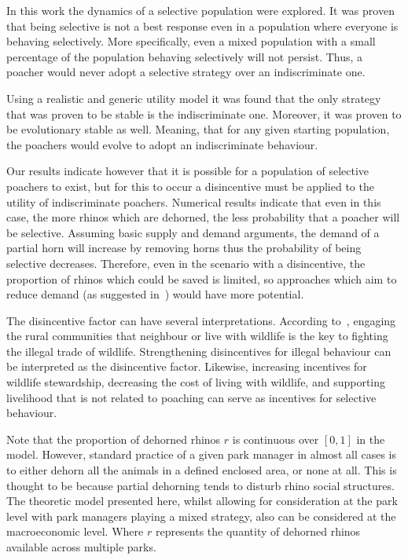\documentclass[10pt]{article}
\begin{document}
In this work the dynamics of a selective population were explored. It was proven 
that being selective is not a best response even in a population where
everyone is behaving selectively. More specifically, even a mixed population with
a small percentage of the population behaving selectively will not persist. Thus,
a poacher would never adopt a selective strategy over an indiscriminate one.

Using a realistic and generic utility model it was found that
the only strategy that was proven to be stable is the indiscriminate one.
Moreover, it was proven to be evolutionary stable as well. Meaning,
that for any given starting population, the poachers would evolve to adopt an
indiscriminate behaviour.

Our results indicate however that it is possible for a population of selective
poachers to exist, but for this to occur a disincentive must be applied to the
utility of indiscriminate poachers. Numerical results indicate that even in this
case, the more rhinos which are dehorned, the less probability that a poacher
will be selective. Assuming basic supply and demand arguments, the demand of
a partial horn will increase by removing horns thus the probability
of being selective decreases. Therefore, even in the scenario with a
disincentive, the proportion of rhinos which could be saved is limited, so
approaches which aim to reduce demand (as suggested in~\cite{Duan2013})
would have more potential.

The disincentive factor can have several interpretations. According to~\citep{Duan2017},
engaging the rural communities that neighbour or live with wildlife is the
key to fighting the illegal trade of wildlife. Strengthening disincentives for
illegal behaviour can be interpreted as the disincentive factor. Likewise,
increasing incentives for wildlife stewardship, decreasing the cost of living
with wildlife, and supporting livelihood that is not related to poaching can 
serve as incentives for selective behaviour.

Note that the proportion of dehorned rhinos \(r\) is continuous over \([0, 1]\)
in the model. However, standard practice of a given park manager in almost all 
cases is to either dehorn all the animals in a defined enclosed area, or none 
at all. This is thought to be because partial dehorning tends to disturb
rhino social structures. The theoretic model presented here, whilst allowing for
consideration at the park level with park managers playing a mixed strategy, also
can be considered at the macroeconomic level. Where \(r\) represents the quantity
of dehorned rhinos available across multiple parks. 
\end{document}
